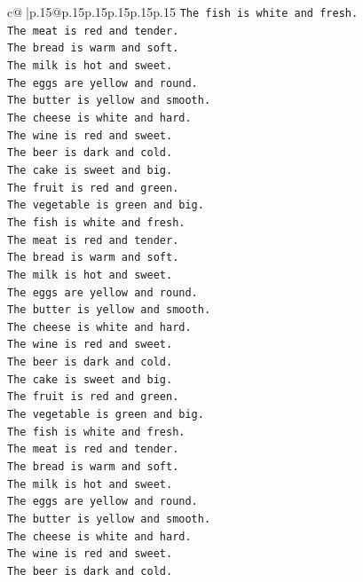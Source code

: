 \documentclass{article}
\begin{document}
{\begin{supertabular}{c@{$\;$}|p{.15\linewidth}@{}p{.15\linewidth}p{.15\linewidth}p{.15\linewidth}p{.15\linewidth}p{.15\linewidth}}
{{{\texttt{The fish is white and fresh.} \\
\texttt{The meat is red and tender.} \\
\texttt{The bread is warm and soft.} \\
\texttt{The milk is hot and sweet.} \\
\texttt{The eggs are yellow and round.} \\
\texttt{The butter is yellow and smooth.} \\
\texttt{The cheese is white and hard.} \\
\texttt{The wine is red and sweet.} \\
\texttt{The beer is dark and cold.} \\
\texttt{The cake is sweet and big.} \\
\texttt{The fruit is red and green.} \\
\texttt{The vegetable is green and big.} \\
\texttt{The fish is white and fresh.} \\
\texttt{The meat is red and tender.} \\
\texttt{The bread is warm and soft.} \\
\texttt{The milk is hot and sweet.} \\
\texttt{The eggs are yellow and round.} \\
\texttt{The butter is yellow and smooth.} \\
\texttt{The cheese is white and hard.} \\
\texttt{The wine is red and sweet.} \\
\texttt{The beer is dark and cold.} \\
\texttt{The cake is sweet and big.} \\
\texttt{The fruit is red and green.} \\
\texttt{The vegetable is green and big.} \\
\texttt{The fish is white and fresh.} \\
\texttt{The meat is red and tender.} \\
\texttt{The bread is warm and soft.} \\
\texttt{The milk is hot and sweet.} \\
\texttt{The eggs are yellow and round.} \\
\texttt{The butter is yellow and smooth.} \\
\texttt{The cheese is white and hard.} \\
\texttt{The wine is red and sweet.} \\
\texttt{The beer is dark and cold.} \\
}}}
\end{supertabular}}
\end{document}
